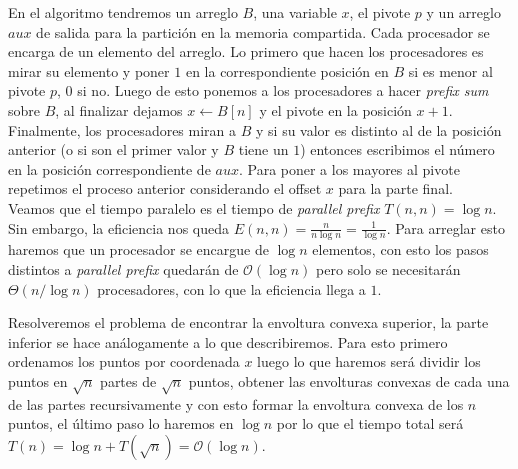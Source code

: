 \documentclass[dcc,uchile]{fcfmcourse}
\theoremstyle{plain}
\theoremstyle{definition}
\begin{document}
\begin{problems}
En el algoritmo tendremos un arreglo $B$,  una variable $x$, el pivote $p$ y un arreglo $aux$ de salida para la partición en la memoria compartida. Cada procesador se encarga de un elemento del arreglo. Lo primero que hacen los procesadores es mirar su elemento y poner $1$ en la correspondiente posición en $B$ si es menor al pivote $p$, $0$ si no. Luego de esto ponemos a los procesadores a hacer \textit{prefix sum} sobre $B$, al finalizar dejamos $x\gets B[n]$ y el pivote en la posición $x+1$. Finalmente, los procesadores miran a $B$ y si su valor es distinto al de la posición anterior (o si son el primer valor y $B$ tiene un $1$) entonces escribimos el número en la posición correspondiente de $aux$. Para poner a los mayores al pivote repetimos el proceso anterior considerando el offset $x$ para la parte final.\\

Veamos que el tiempo paralelo es el tiempo de \textit{parallel prefix} $T(n,n) = \log{n}$. Sin embargo, la eficiencia nos queda $E(n,n) = \frac{n}{n\log{n}} = \frac{1}{\log{n}}$. Para arreglar esto haremos que un procesador se encargue de $\log{n}$ elementos, con esto los pasos distintos a \textit{parallel prefix} quedarán de $\mathcal{O}(\log{n})$ pero solo se necesitarán $\Theta(n/\log{n})$ procesadores, con lo que la eficiencia llega a $1$.

\problem Resolveremos el problema de encontrar la envoltura convexa superior, la parte inferior se hace análogamente a lo que describiremos. Para esto primero ordenamos los puntos por coordenada $x$ luego lo que haremos será dividir los puntos en $\sqrt{n}$ partes de $\sqrt{n}$ puntos, obtener las envolturas convexas de cada una de las partes recursivamente y con esto formar la envoltura convexa de los $n$ puntos, el último paso lo haremos en $\log{n}$ por lo que el tiempo total será $T(n) = \log{n} + T(\sqrt{n}) = \mathcal{O}(\log{n})$.\\


\end{problems}
\end{document}
